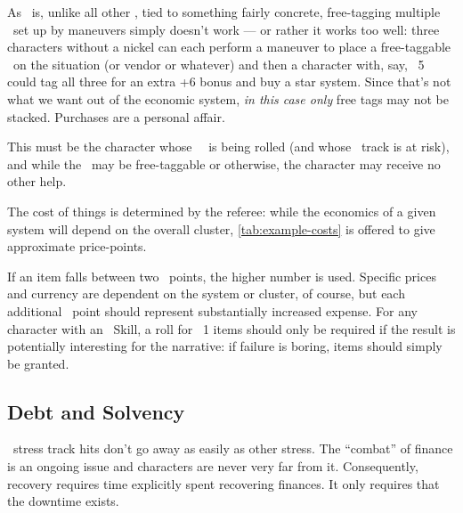 As \Assets\ is, unlike all other \Skills, tied to something fairly concrete, free-tagging multiple \Aspects\ set up by maneuvers simply doesn't work --- or rather it works too well: three characters without a nickel can each perform a maneuver to place a free-taggable \Aspect\ on the situation (or vendor or whatever) and then a character with, say, \Assets\ 5 could tag all three for an extra +6 bonus and buy a star system. Since that's not what we want out of the economic system, \emph{in this case only} free tags may not be stacked. Purchases are a personal affair.



 This must be the character whose \Assets\ \Skill\ is being rolled (and whose \Wealth\ track is at risk), and while the \Aspect\ may be free-taggable or otherwise, the character may receive no other help.

The cost of things is determined by the referee: while the economics of a given system will depend on the overall cluster, \autoref{tab:example-costs} is offered to give approximate price-points.

If an item falls between two \Cost\ points, the higher number is used. Specific prices and currency are dependent on the system or cluster, of course, but each additional \Cost\ point should represent substantially increased expense. For any character with an \Assets\ Skill, a roll for \Cost\ 1 items should only be required if the result is potentially interesting for the narrative: if failure is boring, items should simply be granted.


\subsection{Debt and Solvency}
\label{sec:debt-and-solvency}

\Wealth\ stress track hits don't go away as easily as other stress. The ``combat'' of finance is an ongoing issue and characters are never very far from it. Consequently, recovery requires time explicitly spent recovering finances. It only requires that the downtime exists.

